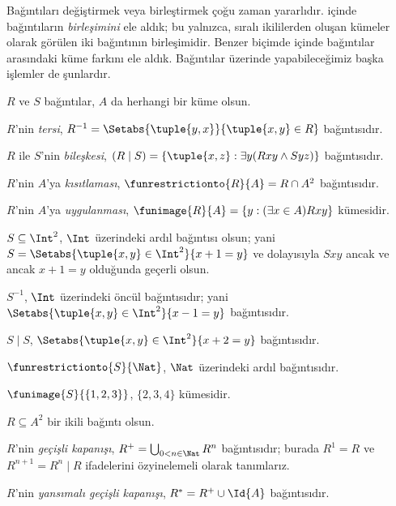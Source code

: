 


Bağıntıları değiştirmek veya birleştirmek çoğu zaman yararlıdır.
 içinde bağıntıların
\emph{birleşimini} ele aldık; bu yalnızca, sıralı ikililerden oluşan kümeler
olarak görülen iki bağıntının birleşimidir. Benzer biçimde
 içinde bağıntılar arasındaki küme farkını
ele aldık. Bağıntılar üzerinde yapabileceğimiz başka işlemler de şunlardır.

\begin{defn}
$R$ ve $S$ bağıntılar, $A$ da herhangi bir küme olsun.

$R$'nin \emph{tersi},
$R^{-1}=\Setabs{\tuple{y,x}}{\tuple{x,y}\in R}$ bağıntısıdır.

$R$ ile $S$'nin \emph{bileşkesi},
$(R \mid S)=\{\tuple{x,z}:\exists y(Rxy\land Syz)\}$ bağıntısıdır.

$R$'nin $A$'ya \emph{kısıtlaması},
$\funrestrictionto{R}{A}=R\cap A^2$ bağıntısıdır.

$R$'nin $A$'ya \emph{uygulanması},
$\funimage{R}{A}=\{y:(\exists x \in A)Rxy\}$ kümesidir.
\end{defn}

\begin{ex}
$S \subseteq \Int^2$, $\Int$ üzerindeki ardıl bağıntısı olsun; yani
$S=\Setabs{\tuple{x,y}\in\Int^2}{x+1=y}$ ve dolayısıyla $Sxy$ ancak ve ancak
$x+1=y$ olduğunda geçerli olsun.

$S^{-1}$, $\Int$ üzerindeki öncül bağıntısıdır; yani
$\Setabs{\tuple{x,y}\in\Int^2}{x-1=y}$ bağıntısıdır.

$S\mid S$, $\Setabs{\tuple{x,y}\in\Int^2}{x+2=y}$ bağıntısıdır.

$\funrestrictionto{S}{\Nat}$, $\Nat$ üzerindeki ardıl bağıntısıdır.

$\funimage{S}{\{1,2,3\}}$, $\{2,3,4\}$ kümesidir.
\end{ex}

\begin{defn}
$R \subseteq A^2$ bir ikili bağıntı olsun.

$R$'nin \emph{geçişli kapanışı},
$R^+=\bigcup_{0<n\in\Nat}R^n$ bağıntısıdır; burada $R^1=R$ ve
$R^{n+1}=R^n\mid R$ ifadelerini özyinelemeli olarak tanımlarız.

$R$'nin \emph{yansımalı geçişli kapanışı}, $R^*=R^+\cup\Id{A}$ bağıntısıdır.
\end{defn}

